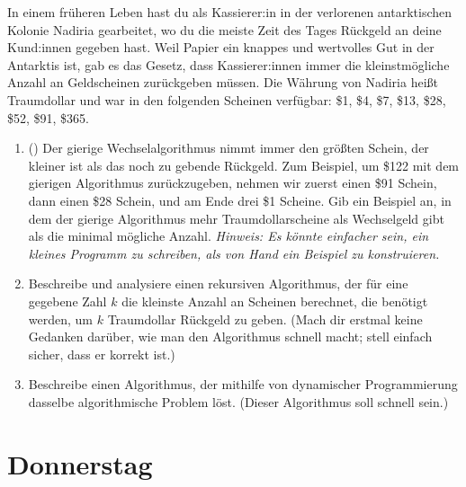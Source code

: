 \documentclass{uebung_cs}
\begin{document}
\begin{aufgabe}
    In einem früheren Leben hast du als Kassierer:in in der verlorenen antarktischen Kolonie Nadiria gearbeitet, wo du die meiste Zeit des Tages Rückgeld an deine Kund:innen gegeben hast.
    Weil Papier ein knappes und wertvolles Gut in der Antarktis ist, gab es das Gesetz, dass Kassierer:innen immer die kleinstmögliche Anzahl an Geldscheinen zurückgeben müssen.
    Die Währung von Nadiria heißt Traumdollar und war in den folgenden Scheinen verfügbar:
    \$1,
    \$4,
    \$7,
    \$13,
    \$28,
    \$52,
    \$91,
    \$365.
    \begin{enumerate}
        \item(\warmup) Der gierige Wechselalgorithmus nimmt immer den größten Schein, der kleiner ist als das noch zu gebende Rückgeld. Zum Beispiel, um \$122 mit dem gierigen Algorithmus zurückzugeben, nehmen wir zuerst einen \$91 Schein, dann einen \$28 Schein, und am Ende drei \$1 Scheine. Gib ein Beispiel an, in dem der gierige Algorithmus mehr Traumdollarscheine als Wechselgeld gibt als die minimal mögliche Anzahl. \emph{Hinweis: Es könnte einfacher sein, ein kleines Programm zu schreiben, als von Hand ein Beispiel zu konstruieren.}
        \item Beschreibe und analysiere einen rekursiven Algorithmus, der für eine gegebene Zahl $k$ die kleinste Anzahl an Scheinen berechnet, die benötigt werden, um $k$ Traumdollar Rückgeld zu geben. (Mach dir erstmal keine Gedanken darüber, wie man den Algorithmus schnell macht; stell einfach sicher, dass er korrekt ist.)
        \item Beschreibe einen Algorithmus, der mithilfe von dynamischer Programmierung dasselbe algorithmische Problem löst. (Dieser Algorithmus soll schnell sein.)
    \end{enumerate}
\end{aufgabe}

\section*{Donnerstag}
\end{document}
